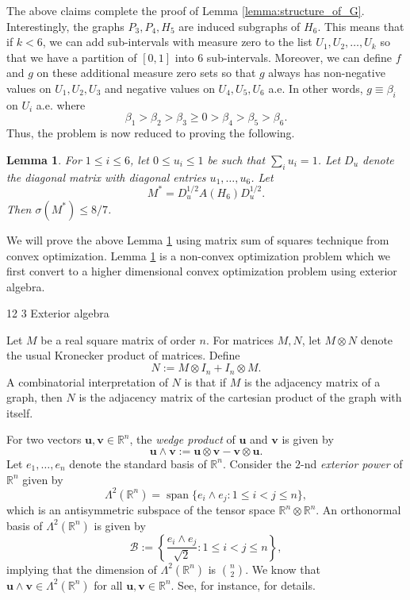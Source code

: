 \documentclass[11pt]{article}
\makeatletter
\renewcommand\subsection{\@startsection{subsection}{2}{\z@}%
{12\p@ \@plus 6\p@ \@minus 3\p@}%
{3\p@ \@plus 6\p@ \@minus 3\p@}%
{\bfseries\boldmath}}
\theoremstyle{plain}
\newtheorem{lemma}[theorem]{Lemma}
\theoremstyle{definition}
\numberwithin{equation}{section}
\makeatother
\begin{document}
The above claims complete the proof of Lemma \ref{lemma:structure_of_G}. Interestingly, 
the graphs $P_3, P_4, H_5$ are induced subgraphs of $H_6$. This means that if $k < 6$, 
we can add sub-intervals with measure zero to the list $U_1, U_2, \ldots, U_k$ so that 
we have a partition of $[0,1]$ into $6$ sub-intervals. Moreover, we can define $f$ and $g$ 
on these additional measure zero sets so that $g$ always has non-negative values on $U_1, U_2, U_3$ 
and negative values on $U_4, U_5, U_6$ a.e. In other words, $g\equiv \beta_i$ on $U_i$ a.e. where 
\[
\beta_1 > \beta_2 > \beta_3 \ge 0 > \beta_4 > \beta_5 > \beta_6.
\] 
Thus, the problem is now reduced to proving the following.

\begin{lemma}\label{lemma:H_6} 
For $1\le i\le 6$, let $0\le u_i\le 1$ be such that $\sum_i u_i = 1$. Let $D_u$ denote the diagonal 
matrix with diagonal entries $u_1, \ldots, u_6$. Let 
\[
M^* = D_{u}^{1/2} A(H_6)D_{u}^{1/2}.
\]
Then $\sigma(M^*)\le 8/7$. 
\end{lemma}

We will prove the above Lemma \ref{lemma:H_6} using matrix sum of squares technique from 
convex optimization. Lemma \ref{lemma:H_6} is a non-convex optimization problem which we 
first convert to a higher dimensional convex optimization problem using exterior algebra. 

\subsection{Exterior algebra}

Let $M$ be a real square matrix of order $n$. For matrices $M,N$, let $M \otimes N$ denote 
the usual Kronecker product of matrices. Define 
\[ 
N:=M\otimes I_n + I_n\otimes M.
\]  
A combinatorial interpretation of $N$ is that if $M$ is the adjacency matrix of a graph, 
then $N$ is the adjacency matrix of the cartesian product of the graph with itself. 

For two vectors $\bm{u}, \bm{v}\in \mathbb{R}^n$, the \emph{wedge product} of $\bm{u}$ and $\bm{v}$ is given by 
\[ 
\bm{u}\wedge \bm{v}:= \bm{u}\otimes \bm{v} - \bm{v}\otimes \bm{u}. 
\]
Let $e_1, \ldots, e_n$ denote the standard basis of $\mathbb{R}^n$. Consider 
the $2$-nd \emph{exterior power} of $\mathbb{R}^n$ given by
\[ 
\Lambda^2 (\mathbb{R}^n)=\operatorname{span}\{e_i\wedge e_j: 1\leq i<j\leq n\},
\]
which is an antisymmetric subspace of the tensor space $\mathbb{R}^n\otimes \mathbb{R}^n$. 
An orthonormal basis of $\Lambda^2 (\mathbb{R}^n)$ is given by
\[
\mathcal{B} := \left\{\frac{e_i \wedge e_j}{\sqrt{2}}: 1\leq i<j\leq n\right\},
\]
implying that the dimension of $\Lambda^2 (\mathbb{R}^n)$ is $\binom{n}{2}$. 
We know that $\bm{u}\wedge \bm{v}\in \Lambda^2 (\mathbb{R}^n)$ for all $\bm{u}, \bm{v}\in \mathbb{R}^n$. 
See, for instance, \cite{MacLane_Birkhoff_1988} for details.  
\end{document}
